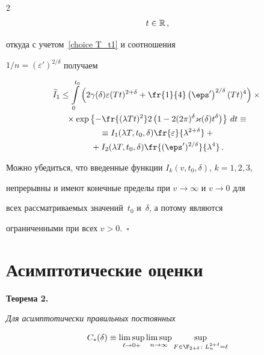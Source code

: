 \begin{multicols}{2}
\begin{multline*}
t\in\R\,,


\end{multline*}


откуда с учетом~\eqref{choice T_t1} и соотношения


$1/n=(\varepsilon')^{2/\delta}$ получаем


\begin{multline*}


\widetilde I_1\le \int\limits_0^{t_0}\left(2\gamma(\delta)\varepsilon(Tt)^{2+\delta}+


\fr{1}{4}\left(\eps'\right)^{2/\delta}(Tt)^4\right)\times{}\\


{}\times  \exp\left\{-\fr{(\lambda


Tt)^2}2 \left(1-2(2\pi)^\delta\varkappa(\delta)t^{\delta} \right)\right\}\,dt


\equiv{}\\


{}\equiv I_1(\lambda T,t_0,\delta)\fr{\varepsilon}{\lambda^{2+\delta}}+{}\\


{}+I_{2}(\lambda T,t_0,\delta)\fr{(\eps')^{2/\delta}}{\lambda^4}\,.


\end{multline*}


Можно убедиться, что введенные функции $I_k(v,t_0,\delta)$, $k=1,2,3$,


непрерывны и имеют конечные пределы при $v\to\infty$ и $v\to 0$ для


всех рассматриваемых значений~$t_0$ и~$\delta$, а потому являются


ограниченными при всех $v>0$.~$\square$





\section{Асимптотические оценки} \label{asympt_estims}





\noindent


\textbf{Теорема 2.}


\textit{Для асимптотически правильных постоянных}


\begin{multline*}


C_*(\delta)\equiv \limsup_{\ell\to0+}\limsup_{n\to\infty}


\sup_{F\in\F_{2+\delta}\colon L_n^{2+\delta}=\ell}



\end{multline*}
\end{multicols}
